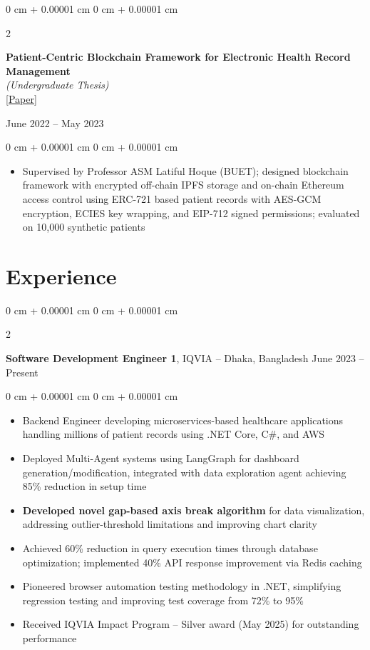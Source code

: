 \documentclass[10pt, letterpaper]{article}
\newenvironment{highlights}{
    \begin{itemize}[
        topsep=0.10 cm,
        parsep=0.10 cm,
        partopsep=0pt,
        itemsep=0pt,
        leftmargin=0 cm + 10pt
    ]
}{
    \end{itemize}
} %
\newenvironment{onecolentry}{
    \begin{adjustwidth}{
        0 cm + 0.00001 cm
    }{
        0 cm + 0.00001 cm
    }
}{
    \end{adjustwidth}
} %
\newenvironment{twocolentry}[2][]{
    \onecolentry
    \def\secondColumn{#2}
    \setcolumnwidth{\fill, 4.5 cm}
    \begin{paracol}{2}
}{
    \switchcolumn \raggedleft \secondColumn
    \end{paracol}
    \endonecolentry
} %
\begin{document}
\begin{twocolentry}{
    {June 2022 – May 2023}
}
    \textbf{Patient-Centric Blockchain Framework for Electronic Health Record Management} \\
    \textit{(Undergraduate Thesis)} \\
    \href{https://tanzimhromel.com/assets/pdf/blockchain-ehr.pdf}{[Paper]}
\end{twocolentry}

\begin{onecolentry}
    \begin{highlights}
        \item Supervised by Professor ASM Latiful Hoque (BUET); designed blockchain framework with encrypted off-chain IPFS storage and on-chain Ethereum access control using ERC-721 based patient records with AES-GCM encryption, ECIES key wrapping, and EIP-712 signed permissions; evaluated on 10,000 synthetic patients
    \end{highlights}
\end{onecolentry}
    
    \section{Experience}
        
        \begin{twocolentry}{
            June 2023 – Present
        }
            \textbf{Software Development Engineer 1}, IQVIA -- Dhaka, Bangladesh\end{twocolentry}

        \vspace{0.10 cm}
        \begin{onecolentry}
            \begin{highlights}
                \item Backend Engineer developing microservices-based healthcare applications handling millions of patient records using .NET Core, C\#, and AWS
                \item Deployed Multi-Agent systems using LangGraph for dashboard generation/modification, integrated with data exploration agent achieving 85\% reduction in setup time
                \item \textbf{Developed novel gap-based axis break algorithm} for data visualization, addressing outlier-threshold limitations and improving chart clarity
                \item Achieved 60\% reduction in query execution times through database optimization; implemented 40\% API response improvement via Redis caching
                \item Pioneered browser automation testing methodology in .NET, simplifying regression testing and improving test coverage from 72\% to 95\%
                \item Received IQVIA Impact Program – Silver award (May 2025) for outstanding performance
            \end{highlights}
        \end{onecolentry}
\end{document}
